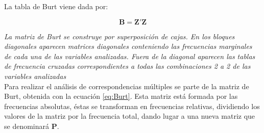 \documentclass[water,article,submit,moreauthors,pdftex]{mdpi}
\begin{document}
La tabla de Burt viene dada por:

\begin{equation}
\mathbf{B}=\mathbf{Z'}\mathbf{Z}
\label{eq:Burt}
\end{equation}

\emph{La matriz de Burt se construye por superposición de cajas. En los
bloques diagonales aparecen matrices diagonales conteniendo las
frecuencias marginales de cada una de las variables analizadas. Fuera de
la diagonal aparecen las tablas de frecuencia cruzadas correspondientes
a todas las combinaciones 2 a 2 de las variables analizadas}\\
Para realizar el análisis de correspondencias múltiples se parte de la
matriz de Burt, obtenida con la ecuación \ref{eq:Burt}. Esta matriz está
formada por las frecuencias absolutas, éstas se transforman en
frecuencias relativas, dividiendo los valores de la matriz por la
frecuencia total, dando lugar a una nueva matriz que se denominará
\textbf{P}.
\end{document}
